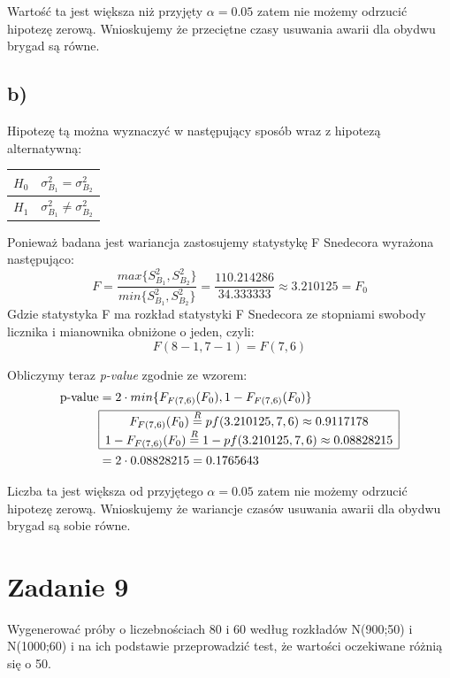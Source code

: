 \documentclass{article}
\begin{document}
Wartość ta jest większa niż przyjęty $\alpha = 0.05$ zatem nie możemy odrzucić hipotezę zerową. Wnioskujemy że przeciętne czasy usuwania awarii dla obydwu brygad są równe.

\subsection{b)}
Hipotezę tą można wyznaczyć w następujący sposób wraz z hipotezą alternatywną:
\begin{center} \begin{tabular}{|c|c|} \hline
$H_0$ & $\sigma^2_{B_1} = \sigma^2_{B_2}$ \\ \hline
$H_1$ & $\sigma^2_{B_1} \neq \sigma^2_{B_2}$ \\ \hline
\end{tabular} \end{center}

Ponieważ badana jest wariancja zastosujemy statystykę F Snedecora wyrażona następująco:
\[ F = \frac{max\{S_{B_1}^2, S_{B_2}^2\}}{min\{S_{B_1}^2, S_{B_2}^2\}} = \frac{110.214286}{34.333333} \approx 3.210125 = F_0 \]
Gdzie statystyka F ma rozkład statystyki F Snedecora ze stopniami swobody licznika i mianownika obniżone o jeden, czyli:
\[ F(8-1, 7-1) = F(7,6) \]

Obliczymy teraz \textit{p-value} zgodnie ze wzorem:
\begin{align*}
\text{p-value} & = 2 \cdot min\{ F_{F(7,6)}(F_0), 1 - F_{F(7,6)}(F_0) \} \\
& \begin{array}{|c|}
\hline
F_{F(7,6)}(F_0)  \overset{R}{=} pf(3.210125, 7, 6) \approx 0.9117178 \\
1 - F_{F(7,6)}(F_0) \overset{R}{=} 1 -  pf(3.210125, 7, 6) \approx  0.08828215\\ \hline
\end{array} \\
& = 2 \cdot 0.08828215 = 0.1765643
\end{align*}

Liczba ta jest większa od przyjętego $\alpha = 0.05$ zatem nie możemy odrzucić hipotezę zerową. Wnioskujemy że wariancje czasów usuwania awarii dla obydwu brygad są sobie równe.

\newpage
\section{Zadanie 9}
Wygenerować próby o liczebnościach 80 i 60 według rozkładów N(900;50) i N(1000;60) i na ich podstawie przeprowadzić test, że wartości oczekiwane różnią się o 50. \\ \par
\end{document}
